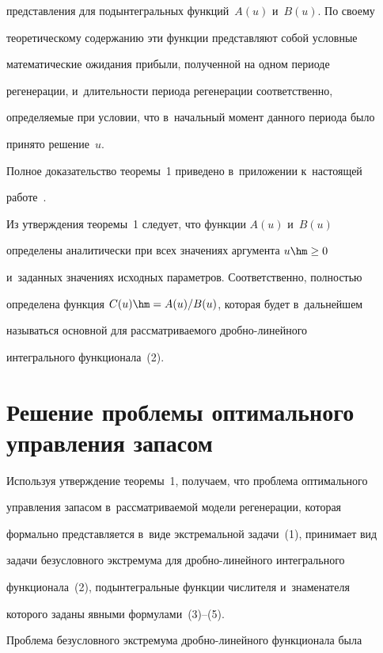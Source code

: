 представления для подын\-те\-граль\-ных функций~$A(u)$ и~$B(u)$. По своему 

теоретическому содержанию эти функции представляют собой условные 

математические ожидания прибыли, полученной на одном периоде 

регенерации, и~длительности периода регенерации соответственно, 

определяемые при условии, что в~начальный момент данного периода было 

принято решение~$u$. 

  

  Полное доказательство теоремы~1 приведено в~приложении к~настоящей 

работе~\cite{17-sh}.

  

  Из утверждения теоремы~1 следует, что функции $A(u)$ и~$B(u)$ 

определены аналитически при всех значениях аргумента $u\hm\geq 0$ 

и~заданных значениях исходных параметров. Соответственно, полностью 

определена функция $C(u)\hm=A(u)/B(u)$, которая будет в~дальнейшем 

называться основной для рассматриваемого дроб\-но-ли\-ней\-но\-го 

интегрального функционала~(2).

  

\section{Решение проблемы оптимального управления запасом}



  Используя утверждение теоремы~1, получаем, что проблема оптимального 

управления запасом в~рассматриваемой модели регенерации, которая 

формально представляется в~виде экстремальной задачи~(1), принимает вид 

задачи безусловного экстремума для дроб\-но-ли\-ней\-но\-го интегрального 

функционала~(2), подынтегральные функции числителя и~знаменателя 

которого заданы явными формулами~(3)--(5).

  

  Проблема безусловного экстремума дроб\-но-ли\-ней\-но\-го функционала была 

